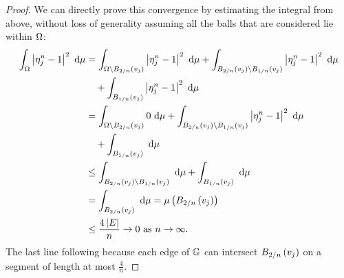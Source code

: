 \begin{proof}
	We can directly prove this convergence by estimating the integral from above, without loss of generality assuming all the balls that are considered lie within $\Omega$:
	\begin{align*}
		\int_{\Omega}\left\lvert \eta_j^n-1 \right\rvert^2 \ \mathrm{d}\mu 
		&= \int_{\Omega\setminus B_{2/n}\left( v_j \right)}\left\lvert \eta_j^n-1 \right\rvert^2 \ \mathrm{d}\mu 
		+ \int_{B_{2/n}\left( v_j \right) \setminus B_{1/n}\left( v_j \right)}\left\lvert \eta_j^n-1 \right\rvert^2 \ \mathrm{d}\mu \\ 
		&\quad + \int_{B_{1/n}\left( v_j \right)}\left\lvert \eta_j^n-1 \right\rvert^2 \ \mathrm{d}\mu \\
		&= \int_{\Omega\setminus B_{2/n}\left( v_j \right)}0 \ \mathrm{d}\mu + \int_{B_{2/n}\left( v_j \right) \setminus B_{1/n}\left( v_j \right)}\left\lvert \eta_j^n-1 \right\rvert^2 \ \mathrm{d}\mu \\ 
		&\quad + \int_{B_{1/n}\left( v_j \right)} \ \mathrm{d}\mu \\
		&\leq \int_{B_{2/n}\left( v_j \right) \setminus B_{1/n}\left( v_j \right)} \ \mathrm{d}\mu 
		+ \int_{B_{1/n}\left( v_j \right)} \ \mathrm{d}\mu \\
		&= \int_{B_{2/n}\left( v_j \right)} \ \mathrm{d}\mu 
		= \mu\left( B_{2/n}\left( v_j \right) \right) \\
		&\leq \frac{4 \left\lvert E \right\rvert}{n} \rightarrow0 \ \text{as} \ n \rightarrow\infty.
	\end{align*}
	The last line following because each edge of $\mathbb{G}$ can intersect $B_{2/n}\left( v_j \right)$ on a segment of length at most $\frac{4}{n}$.
\end{proof}

